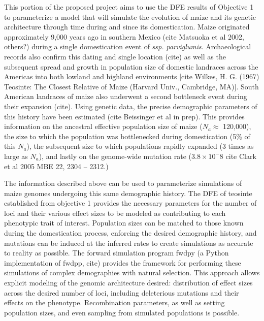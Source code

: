  This portion of the proposed project aims to use the DFE results of Objective 1 to parameterize a model that will simulate the evolution of maize and its genetic architecture through time during and since its domestication.
Maize originated approximately 9,000 years ago in southern Mexico (cite Matsuoka et al 2002, others?) during a single domestication event of \emph{ssp. parviglumis}. Archaeological records also confirm this dating and single location (cite) as well as the subsequent spread and growth in population size of domestic landraces across the Americas into both lowland and highland environments [cite Wilkes, H. G. (1967) Teosinte: The Closest Relative of Maize (Harvard Univ., Cambridge, MA)]. South American landraces of maize also underwent a second bottleneck event during their expansion (cite). Using genetic data, the precise demographic parameters of this history have been estimated (cite Beissinger et al in prep). This provides information on the ancestral effective population size of maize ($N_a \approx$ 120,000), the size to which the population was bottlenecked during domestication (5\% of this $N_a$), the subsequent size to which populations rapidly expanded (3 times as large as $N_a$), and lastly on the genome-wide mutation rate ($3.8\times10^-8$ cite Clark et al 2005 MBE 22, 2304 -- 2312.)

The information described above can be used to parameterize simulations of maize genomes undergoing this same demographic history. The DFE of teosinte established from objective 1 provides the necessary parameters for the number of loci and their various effect sizes to be modeled as contributing to each phenotypic trait of interest. Population sizes can be matched to those known during the domestication process, enforcing the desired demographic history, and mutations can be induced at the inferred rates to create simulations as accurate to reality as possible.  The forward simulation program fwdpy (a Python implementation of fwdpp, cite) provides the framework for performing these simulations of complex demographies with natural selection. This approach allows explicit modeling of the genomic architecture desired: distribution of effect sizes across the desired number of loci, including deleterious mutations and their effects on the phenotype. Recombination parameters, as well as setting population sizes, and even sampling from simulated populations is possible.

